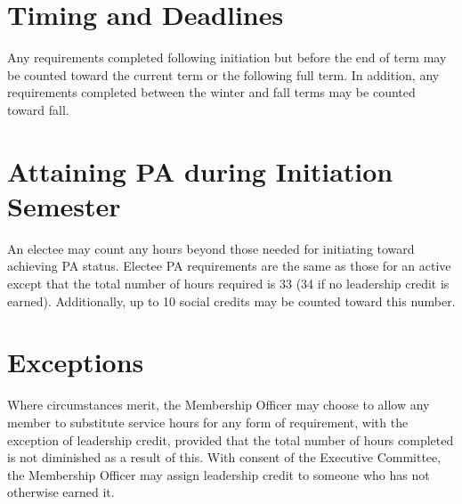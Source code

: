 \section{Timing and Deadlines} Any requirements completed following initiation but before the end of term may be counted toward the current term or the following full term. In addition, any requirements completed between the winter and fall terms may be counted toward fall. 

\section{Attaining PA during Initiation Semester} An electee may count any hours beyond those needed for initiating toward achieving PA status. Electee PA requirements are the same as those for an active except that the total number of hours required is 33 (34 if no leadership credit is earned). Additionally, up to 10 social credits may be counted toward this number.
\section{Exceptions} Where circumstances merit, the Membership Officer may choose to allow any member to substitute service hours for any form of requirement, with the exception of leadership credit, provided that the total number of hours completed is not diminished as a result of this. With consent of the Executive Committee, the Membership Officer may assign leadership credit to someone who has not otherwise earned it. 


